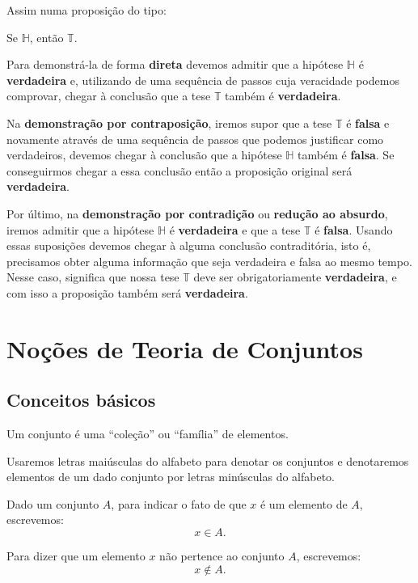 Assim numa proposição do tipo:
\begin{center}
    Se $\mathbb{H}$, então $\mathbb{T}$.
\end{center}

Para demonstrá-la de forma \textbf{direta} devemos admitir que a hipótese $\mathbb{H}$ é \textbf{verdadeira} e, utilizando de uma sequência de passos
cuja veracidade podemos comprovar, chegar à conclusão que a tese $\mathbb{T}$ também é \textbf{verdadeira}.

Na \textbf{demonstração por contraposição}, iremos supor que a tese $\mathbb{T}$ é \textbf{falsa} e novamente através de uma
sequência de passos que podemos justificar como verdadeiros, devemos chegar à conclusão que a hipótese $\mathbb{H}$ também é
\textbf{falsa}. Se conseguirmos chegar a essa conclusão então a proposição original será \textbf{verdadeira}.

Por último, na \textbf{demonstração por contradição} ou \textbf{redução ao absurdo}, iremos admitir que a hipótese
$\mathbb{H}$ é \textbf{verdadeira} e que a tese $\mathbb{T}$ é \textbf{falsa}. Usando essas suposições devemos chegar à alguma
conclusão contraditória, isto é, precisamos obter alguma informação que seja verdadeira e falsa ao mesmo tempo. Nesse caso,
significa que nossa tese $\mathbb{T}$ deve ser obrigatoriamente \textbf{verdadeira}, e com isso a proposição também será
\textbf{verdadeira}.



\chapter{Noções de Teoria de Conjuntos}
\section{Conceitos básicos}

Um conjunto é uma ``coleção'' ou ``família'' de elementos.

Usaremos letras maiúsculas do alfabeto para denotar os conjuntos e denotaremos elementos de um dado conjunto por letras minúsculas do alfabeto.

Dado um conjunto $A$, para indicar o fato de que $x$ é um elemento de $A$, escrevemos:
\[
    x \in A.
\]

Para dizer que um elemento $x$ não pertence ao conjunto $A$, escrevemos:
\[
    x \notin A.
\]

